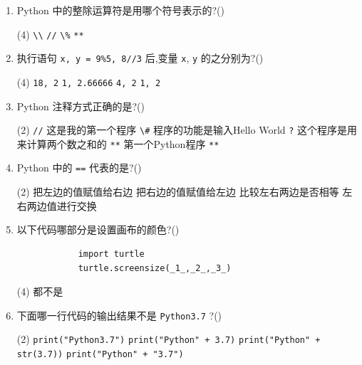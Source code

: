 \documentclass[11pt]{ctexart}
\begin{document}
\begin{enumerate}
        \item Python 中的整除运算符是用哪个符号表示的?(\qquad)
        \begin{tasks}(4)
            \task \lstinline{\\}
            \task \lstinline{//}
            \task \lstinline{\%}
            \task \lstinline{**}
        \end{tasks}

        \item 执行语句 \lstinline{x, y = 9%5, 8//3} 后,变量 \lstinline{x}, \lstinline{y} 的之分别为?(\qquad)
        \begin{tasks}(4)
            \task \lstinline{18, 2}
            \task \lstinline{1, 2.66666}
            \task \lstinline{4, 2}
            \task \lstinline{1, 2}
        \end{tasks}

        \item Python 注释方式正确的是?(\qquad)
        \begin{tasks}(2)
            \task \lstinline{//} 这是我的第一个程序
            \task \lstinline{\#} 程序的功能是输入Hello World
            \task \lstinline{?} 这个程序是用来计算两个数之和的
            \task \lstinline{**} 第一个Python程序 \lstinline{**}
        \end{tasks}

        \newpage
        \item Python 中的 \verb|==| 代表的是?(\qquad)
        \begin{tasks}(2)
            \task 把左边的值赋值给右边
            \task 把右边的值赋值给左边
            \task 比较左右两边是否相等
            \task 左右两边值进行交换
        \end{tasks}
        
        \item 以下代码哪部分是设置画布的颜色?(\qquad)
        \begin{lstlisting}
            import turtle
            turtle.screensize(_1_,_2_,_3_)
        \end{lstlisting}
        \begin{tasks}(4)
            \task 都不是
        \end{tasks}

        \item 下面哪一行代码的输出结果不是 \lstinline{Python3.7} ?(\qquad)
        \begin{tasks}(2)
            \task \lstinline{print("Python3.7")}
            \task \lstinline{print("Python" + 3.7)}
            \task \lstinline{print("Python" + str(3.7))}
            \task \lstinline{print("Python" + "3.7")}
        \end{tasks}


\end{enumerate}
\end{document}
